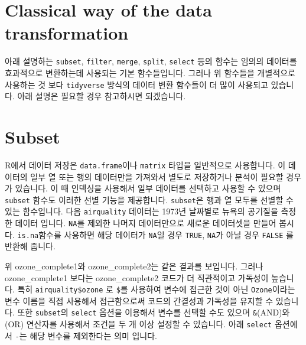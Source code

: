 \documentclass[
  a4paper,
]{book}
\newenvironment{Shaded}{\begin{snugshade}}{\end{snugshade}}
\newcommand{\FunctionTok}[1]{\textcolor[rgb]{0.28,0.35,0.67}{#1}}
\newcommand{\NormalTok}[1]{\textcolor[rgb]{0.00,0.23,0.31}{#1}}
\newcommand{\OtherTok}[1]{\textcolor[rgb]{0.00,0.23,0.31}{#1}}
\newcommand{\SpecialCharTok}[1]{\textcolor[rgb]{0.37,0.37,0.37}{#1}}
\begin{document}
\hypertarget{classical-way-of-the-data-transformation}{%
\section{Classical way of the data
transformation}\label{classical-way-of-the-data-transformation}}

아래 설명하는 \texttt{subset}, \texttt{filter}, \texttt{merge},
\texttt{split}, \texttt{select} 등의 함수는 임의의 데이터를 효과적으로
변환하는데 사용되는 기본 함수들입니다. 그러나 위 함수들을 개별적으로
사용하는 것 보다 \texttt{tidyverse} 방식의 데이터 변환 함수들이 더 많이
사용되고 있습니다. 아래 설명은 필요할 경우 참고하시면 되겠습니다.

\hypertarget{subset}{%
\section{Subset}\label{subset}}

R에서 데이터 저장은 \texttt{data.frame}이나 \texttt{matrix} 타입을
일반적으로 사용합니다. 이 데이터의 일부 열 또는 행의 데이터만을 가져와서
별도로 저장하거나 분석이 필요할 경우가 있습니다. 이 때 인덱싱을 사용해서
일부 데이터를 선택하고 사용할 수 있으며 \texttt{subset} 함수도 이러한
선별 기능을 제공합니다. \texttt{subset}은 행과 열 모두를 선별할 수 있는
함수입니다. 다음 \texttt{airquality} 데이터는 1973년 날짜별로 뉴욕의
공기질을 측정한 데이터 입니다. \texttt{NA}를 제외한 나머지 데이터만으로
새로운 데이터셋을 만들어 봅시다. \texttt{is.na}함수를 사용하면 해당
데이터가 \texttt{NA}일 경우 \texttt{TRUE}, \texttt{NA}가 아닐 경우
\texttt{FALSE} 를 반환해 줍니다.

\begin{Shaded}
\end{Shaded}

위 ozone\_complete1와 ozone\_complete2는 같은 결과를 보입니다. 그러나
ozone\_complete1 보다는 ozone\_complete2 코드가 더 직관적이고 가독성이
높습니다. 특히 \texttt{airquality\$ozone} 로 \texttt{\$}를 사용하여
변수에 접근한 것이 아닌 \texttt{Ozone}이라는 변수 이름을 직접 사용해서
접근함으로써 코드의 간결성과 가독성을 유지할 수 있습니다. 또한
\texttt{subset}의 \texttt{select} 옵션을 이용해서 변수를 선택할 수도
있으며 \texttt{\&}(AND)와 \texttt{\textbar{}}(OR) 연산자를 사용해서
조건을 두 개 이상 설정할 수 있습니다. 아래 \texttt{select} 옵션에서
\texttt{-}는 해당 변수를 제외한다는 의미 입니다.
\end{document}
